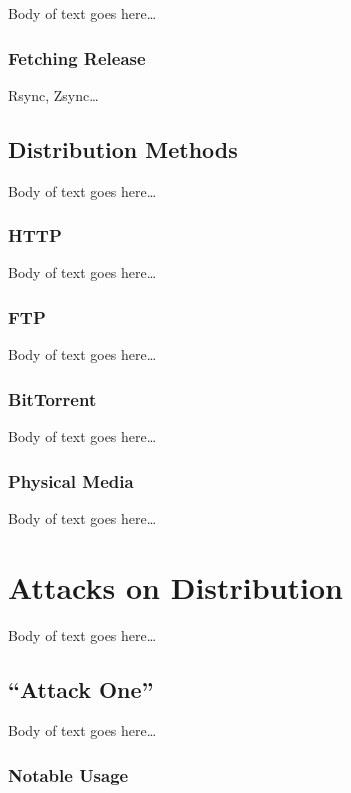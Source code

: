 \documentclass[conference]{IEEEtran}
\begin{document}
Body of text goes here\ldots

\subsubsection{Fetching Release}

Rsync, Zsync\ldots

\subsection{Distribution Methods}

Body of text goes here\ldots

\subsubsection{HTTP}

Body of text goes here\ldots

\subsubsection{FTP}

Body of text goes here\ldots

\subsubsection{BitTorrent}

Body of text goes here\ldots

\subsubsection{Physical Media}

Body of text goes here\ldots

\section{Attacks on Distribution}

Body of text goes here\ldots

\subsection{``Attack One''}

Body of text goes here\ldots

\subsubsection{Notable Usage}
\end{document}
